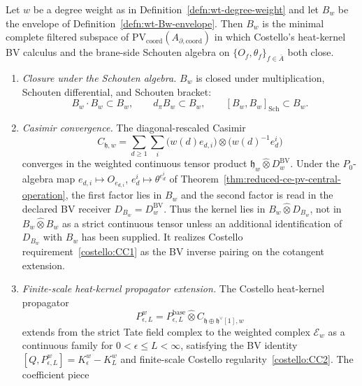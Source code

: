 \begin{thm}\label{thm:wt-canonical-envelope}
  Let $w$ be a degree weight as in
  Definition~\ref{defn:wt-degree-weight} and let $B_w$ be the envelope
  of Definition~\ref{defn:wt-Bw-envelope}.  Then $B_w$ is the minimal
  complete filtered subspace of
  $\mathrm{PV}_{\mathrm{coord}}(A_{\partial,\mathrm{coord}})$ in which
  Costello's heat-kernel BV calculus and the brane-side Schouten algebra
  on $\{O_f,\theta_f\}_{f\in\bar A}$ both close.
  \begin{enumerate}[label=(\alph*)]
    \item\label{wt:canon:closure}
      \emph{Closure under the Schouten algebra.} $B_w$ is
      closed under multiplication, Schouten differential, and Schouten
      bracket:
      \[
        B_w\cdot B_w\subset B_w,\qquad
        d_\pi B_w\subset B_w,\qquad
        [B_w,B_w]_{\mathrm{Sch}}\subset B_w.
      \]
    \item\label{wt:canon:casimir}
      \emph{Casimir convergence.} The diagonal-rescaled Casimir
      \[
        C_{\mathfrak h,w}=\sum_{d\geq1}\sum_i
          \bigl(w(d)e_{d,i}\bigr)\otimes
          \bigl(w(d)^{-1}e^i_d\bigr)
      \]
      converges in the weighted continuous tensor product
      $\mathfrak h_w\widehat\otimes
      D^{\mathrm{BV}}_w$. Under the
      $P_0$-algebra map $e_{d,i}\mapsto O_{e_{d,i}}$,
      $e^i_d\mapsto\theta^{e^i_d}$ of
      Theorem~\ref{thm:reduced-ce-pv-central-operation}, the first
      factor lies in \(B_w\) and the second factor is read in the
      declared BV receiver \(D_{B_w}=D^{\mathrm{BV}}_w\).  Thus the
      kernel lies in
      \(B_w\widehat\otimes D_{B_w}\), not in
      \(B_w\widehat\otimes B_w\) as a strict continuous tensor unless
      an additional identification of \(D_{B_w}\) with \(B_w\) has been
      supplied.  It realizes Costello requirement~\ref{costello:CC1} as
      the BV inverse pairing on the cotangent extension.
    \item\label{wt:canon:propagator}
      \emph{Finite-scale heat-kernel propagator extension.} The Costello heat-kernel
      propagator
      \[
        P^w_{\epsilon,L}
          =P^{\mathrm{base}}_{\epsilon,L}\widehat\otimes
            C_{\mathfrak h\oplus\mathfrak h^\vee[1],w}
      \]
      extends from the strict Tate field complex to the weighted complex
      $\mathcal E_w$ as a continuous family for $0<\epsilon\leq L<\infty$,
      satisfying the BV identity
      $[Q,P^w_{\epsilon,L}]=K^w_\epsilon-K^w_L$ and finite-scale
      Costello regularity~\ref{costello:CC2}.  The coefficient piece

\end{enumerate}
\end{thm}
